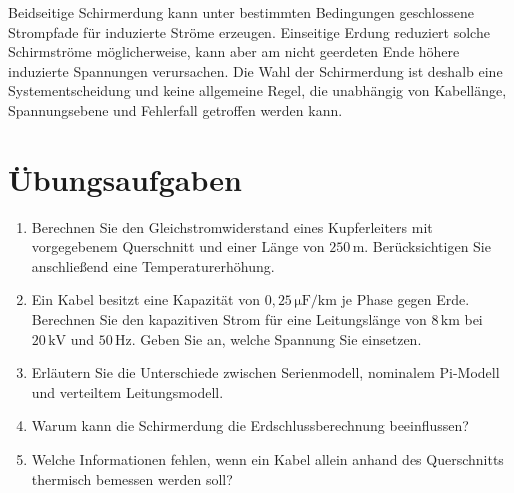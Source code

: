 Beidseitige Schirmerdung kann unter bestimmten Bedingungen geschlossene
Strompfade für induzierte Ströme erzeugen. Einseitige Erdung reduziert solche
Schirmströme möglicherweise, kann aber am nicht geerdeten Ende höhere
induzierte Spannungen verursachen. Die Wahl der Schirmerdung ist deshalb
eine Systementscheidung und keine allgemeine Regel, die unabhängig von
Kabellänge, Spannungsebene und Fehlerfall getroffen werden kann.

\section{Übungsaufgaben}

\begin{enumerate}
  \item Berechnen Sie den Gleichstromwiderstand eines Kupferleiters mit
        vorgegebenem Querschnitt und einer Länge von \(250\,\mathrm m\).
        Berücksichtigen Sie anschließend eine Temperaturerhöhung.
  \item Ein Kabel besitzt eine Kapazität von \(0{,}25\,\mathrm{\mu F/km}\)
        je Phase gegen Erde. Berechnen Sie den kapazitiven Strom für eine
        Leitungslänge von \(8\,\mathrm{km}\) bei \(20\,\mathrm{kV}\) und
        \(50\,\mathrm{Hz}\). Geben Sie an, welche Spannung Sie einsetzen.
  \item Erläutern Sie die Unterschiede zwischen Serienmodell, nominalem
        Pi-Modell und verteiltem Leitungsmodell.
  \item Warum kann die Schirmerdung die Erdschlussberechnung beeinflussen?
  \item Welche Informationen fehlen, wenn ein Kabel allein anhand des
        Querschnitts thermisch bemessen werden soll?
\end{enumerate}